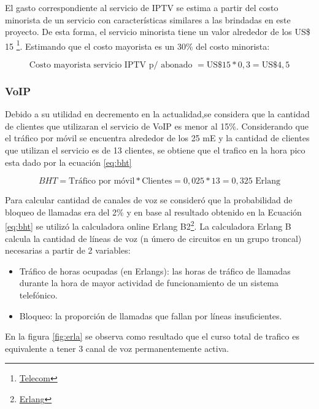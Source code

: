 \documentclass[11pt,a4paper]{article}
\begin{document}
El gasto correspondiente al servicio de IPTV se estima a partir del costo minorista de un servicio con características similares a las brindadas en este proyecto. De esta forma, el servicio minorista tiene un valor alrededor de los US\$ 15 \footnote{\href{https://compraonline.telecom.com.ar/producto/telecomunicaciones/tv-por-cable}{Telecom}}. Estimando que el costo mayorista es un 30\% del costo minorista:

\begin{equation}
    \text{Costo mayorista servicio IPTV p/ abonado } = \text{US}\$ 15 * 0,3 = \text{US}\$ 4,5 
\end{equation}

\subsubsection{VoIP}

Debido a su utilidad en decremento en la actualidad,se considera que la cantidad de clientes que utilizaran el servicio de VoIP es menor al 15\%.
Considerando que el tráfico por móvil se encuentra alrededor de los 25 mE y la cantidad de clientes que utilizan el servicio es de 13 clientes, se obtiene que el trafico en la hora pico esta dado por la ecuación \ref{eq:bht}

\begin{equation}
    BHT = \text{Tráfico por móvil} * \text{Clientes} = 0,025 * 13 = 0,325 \text{ Erlang}
    \label{eq:bht}
\end{equation}

Para calcular cantidad de canales de voz se consideró que la probabilidad de bloqueo de
llamadas era del 2\% y en base al resultado obtenido en la Ecuación \ref{eq:bht} se utilizó la calculadora online Erlang B2\footnote{\href{https://www.erlang.com/calculator/erlb/}{Erlang}}. 
La calculadora Erlang B calcula la cantidad de líneas de voz (n úmero de circuitos en un grupo troncal) necesarias a partir de 2 variables:
\begin{itemize}
    \item Tráfico de horas ocupadas (en Erlangs): las horas de tráfico de llamadas durante la hora de mayor actividad de funcionamiento de un sistema telefónico.
\item Bloqueo: la proporción de llamadas que fallan por líneas insuficientes.
\end{itemize}

En la figura \ref{fig:erla} se observa como resultado que el curso total de trafico es equivalente a tener 3 canal de voz permanentemente activa. 
\end{document}
